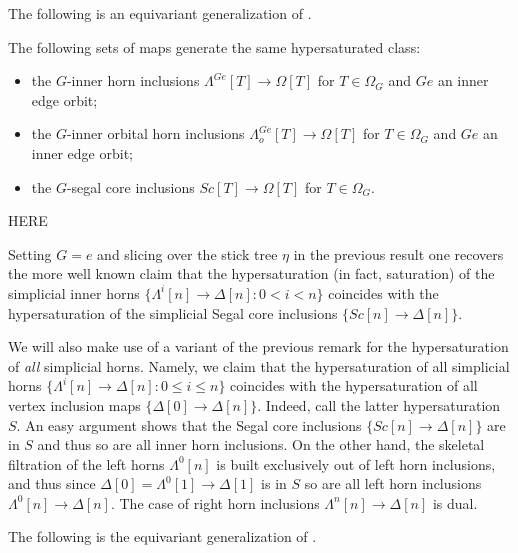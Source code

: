 \documentclass[a4paper,10pt,draft]{article}%
\numberwithin{equation}{section}%
\begin{document}
The following is an equivariant generalization of 
\cite[Props. 2.4 and 2.5]{CM13a}.

\begin{proposition}
      \label{HYPER PROP}
The following sets of maps generate the same hypersaturated class:
\begin{itemize}
\item the $G$-inner horn inclusions
$\Lambda^{Ge} [T] \to \Omega[T]$ for $T \in \Omega_G$ and $Ge$ an inner edge orbit; 
\item the $G$-inner orbital horn inclusions
$\Lambda^{Ge}_o [T] \to \Omega[T]$ for $T \in \Omega_G$ and $Ge$ an inner edge orbit; 
\item the $G$-segal core inclusions
$Sc [T] \to \Omega[T]$ for $T \in \Omega_G$.
\end{itemize}

\end{proposition}

{\color{red} HERE}

\begin{remark}
	Setting $G=e$ and slicing over the stick tree $\eta$ in the previous result
	one recovers the more well known claim that 
	the hypersaturation (in fact, saturation) of the simplicial inner horns
	$\{\Lambda^i[n] \to \Delta[n] \colon 0< i < n\}$
	coincides with the hypersaturation of the simplicial Segal core inclusions
	$\{Sc[n] \to \Delta[n]\}$.
\end{remark}

\begin{remark}\label{HYPERSATKAN REM}
	We will also make use of a variant of the previous remark for the hypersaturation of \textit{all} simplicial horns.
	Namely, we claim that the hypersaturation of all simplicial horns 
	$\{\Lambda^i[n] \to \Delta[n] \colon 0 \leq i \leq n\}$
	coincides with the hypersaturation of all vertex inclusion maps
	$\{\Delta[0] \to \Delta[n]\}$.
	Indeed, call the latter hypersaturation $S$. 
	An easy argument shows that the Segal core inclusions 
	$\{Sc[n] \to \Delta[n]\}$ are in $S$ and thus so are all inner horn inclusions. On the other hand, the skeletal filtration of the left horns $\Lambda^0[n]$ is built exclusively out of left horn inclusions, and thus since $\Delta[0]=\Lambda^0[1] \to \Delta[1]$ is in $S$ so are all left horn inclusions 
	$\Lambda^0[n] \to \Delta[n]$. The case of right horn inclusions $\Lambda^n[n] \to \Delta[n]$ is dual.
\end{remark}


The following is the equivariant generalization of 
\cite[Thm. 3.5]{CM13a}.
\end{document}
